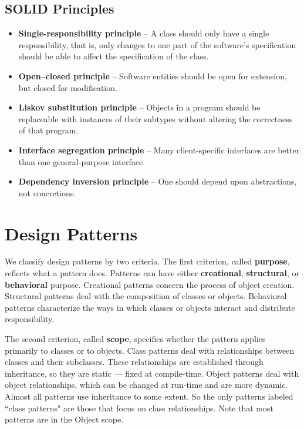 \documentclass{article}
\begin{document}
\subsection{SOLID Principles}

\begin{itemize}
    \item \textbf{Single-responsibility principle} -- A class should only have a single responsibility, that is, only changes to one part of the software's specification should be able to affect the specification of the class.

    \item \textbf{Open–closed principle} -- Software entities should be open for extension, but closed for modification.
    
    \item \textbf{Liskov substitution principle} -- Objects in a program should be replaceable with instances of their subtypes without altering the correctness of that program.
    
    \item \textbf{Interface segregation principle} -- Many client-specific interfaces are better than one general-purpose interface.
    
    \item \textbf{Dependency inversion principle} -- One should depend upon abstractions, not concretions.
\end{itemize}


\newpage
\section{Design Patterns}

We classify design patterns by two criteria. The first criterion, called \textbf{purpose}, reflects what a pattern does. Patterns can have either \textbf{creational}, \textbf{structural}, or \textbf{behavioral} purpose. Creational patterns concern the process of object creation. Structural patterns deal with the composition of classes or objects. Behavioral patterns characterize the ways in which classes or objects interact and distribute responsibility.

The second criterion, called \textbf{scope}, specifies whether the pattern applies primarily to classes or to objects. Class patterns deal with relationships between classes and their subclasses. These relationships are established through inheritance, so they are static — fixed at compile-time. Object patterns deal with object relationships, which can be changed at run-time and are more dynamic. Almost all patterns use inheritance to some extent. So the only patterns labeled ``class patterns" are those that focus on class relationships. Note that most patterns are in the Object scope.
\end{document}
